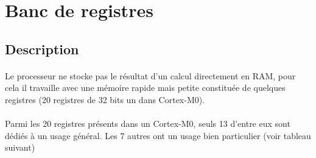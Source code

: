 \section{Banc de registres}

\subsection{Description}

	\paragraph{}
	Le processeur ne stocke pas le résultat d'un calcul directement en RAM, pour cela il travaille avec une mémoire rapide mais petite constituée de quelques registres (20 registres de 32 bits un dans Cortex-M0).

	\paragraph{}
	Parmi les 20 registres présents dans un Cortex-M0, seuls 13 d'entre eux sont dédiés à un usage général. Les 7 autres ont un usage bien particulier (voir tableau suivant)

\vspace{1em}

